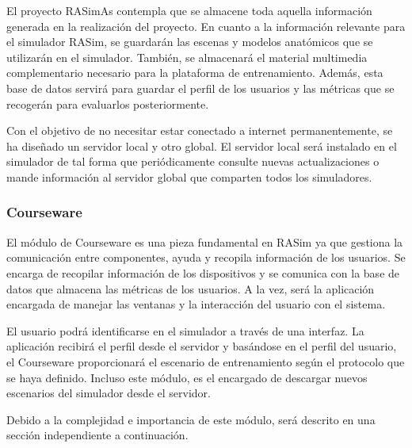 El proyecto \ac{RASimAs} contempla que se almacene toda aquella información generada en la realización del proyecto. En cuanto a la información relevante para el simulador \ac{RASim}, se guardarán las escenas y modelos anatómicos que se utilizarán en el simulador. También, se almacenará el material multimedia complementario necesario para la plataforma de entrenamiento. Además, esta base de datos servirá para guardar el perfil de los usuarios y las métricas que se recogerán para evaluarlos posteriormente.

Con el objetivo de no necesitar estar conectado a internet permanentemente, se ha diseñado un servidor local y otro global. El servidor local será instalado en el simulador de tal forma que periódicamente consulte nuevas actualizaciones o mande información al servidor global que comparten todos los simuladores.

\subsubsection{Courseware}


El módulo de \ac{Courseware} es una pieza fundamental en \ac{RASim} ya que gestiona la comunicación entre componentes, ayuda y recopila información de los usuarios. Se encarga de recopilar información de los dispositivos y se comunica con la base de datos que almacena las métricas de los usuarios. A la vez, será la aplicación encargada de manejar las ventanas y la interacción del usuario con el sistema. 

El usuario podrá identificarse en el simulador a través de una interfaz. La aplicación recibirá el perfil desde el servidor y basándose en el perfil del usuario, el \ac{Courseware} proporcionará el escenario de entrenamiento según el protocolo que se haya definido. Incluso este módulo, es el encargado de descargar nuevos escenarios del simulador desde el servidor. 

Debido a la complejidad e importancia de este módulo, será descrito en una sección independiente a continuación.

